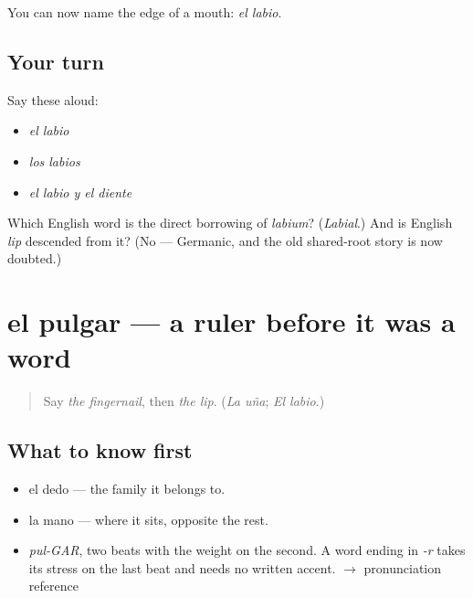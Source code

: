 \begin{grammarlens}[title={What you've built}]
You can now name the edge of a mouth: \emph{el labio}.
\end{grammarlens}

\subsection*{Your turn}
Say these aloud:

\begin{itemize}
\raggedright
  \item \emph{el labio}
  \item \emph{los labios}
  \item \emph{el labio y el diente}
\end{itemize}

\begin{tcolorbox}[breakable,colback=teal!4,colframe=teal!35!black,title={Before you move on}]
Which English word is the direct borrowing of \emph{labium}? (\emph{Labial}.) And is English \emph{lip} descended from it? (No — Germanic, and the old shared-root story is now doubted.)
\end{tcolorbox}
\section[el pulgar]{el pulgar — a ruler before it was a word}

\label{lesson:ES-C375-pulgar}



\begin{quote}
Say \emph{the fingernail}, then \emph{the lip}. (\emph{La uña}; \emph{El labio}.)
\end{quote}

\subsection*{What to know first}
\begin{itemize}
\raggedright
  \item el dedo — the family it belongs to.
  \item la mano — where it sits, opposite the rest.
\end{itemize}

\begin{sounds}
\begin{itemize}
\raggedright
  \item \emph{pul-GAR}, two beats with the weight on the second. A word ending in \emph{-r} takes its stress on the last beat and needs no written accent. $\to$ pronunciation reference
\end{itemize}
\end{sounds}

